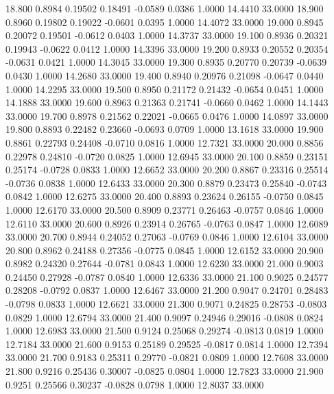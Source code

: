   18.800   0.8984   0.19502   0.18491  -0.0589   0.0386   1.0000  14.4410  33.0000
  18.900   0.8960   0.19802   0.19022  -0.0601   0.0395   1.0000  14.4072  33.0000
  19.000   0.8945   0.20072   0.19501  -0.0612   0.0403   1.0000  14.3737  33.0000
  19.100   0.8936   0.20321   0.19943  -0.0622   0.0412   1.0000  14.3396  33.0000
  19.200   0.8933   0.20552   0.20354  -0.0631   0.0421   1.0000  14.3045  33.0000
  19.300   0.8935   0.20770   0.20739  -0.0639   0.0430   1.0000  14.2680  33.0000
  19.400   0.8940   0.20976   0.21098  -0.0647   0.0440   1.0000  14.2295  33.0000
  19.500   0.8950   0.21172   0.21432  -0.0654   0.0451   1.0000  14.1888  33.0000
  19.600   0.8963   0.21363   0.21741  -0.0660   0.0462   1.0000  14.1443  33.0000
  19.700   0.8978   0.21562   0.22021  -0.0665   0.0476   1.0000  14.0897  33.0000
  19.800   0.8893   0.22482   0.23660  -0.0693   0.0709   1.0000  13.1618  33.0000
  19.900   0.8861   0.22793   0.24408  -0.0710   0.0816   1.0000  12.7321  33.0000
  20.000   0.8856   0.22978   0.24810  -0.0720   0.0825   1.0000  12.6945  33.0000
  20.100   0.8859   0.23151   0.25174  -0.0728   0.0833   1.0000  12.6652  33.0000
  20.200   0.8867   0.23316   0.25514  -0.0736   0.0838   1.0000  12.6433  33.0000
  20.300   0.8879   0.23473   0.25840  -0.0743   0.0842   1.0000  12.6275  33.0000
  20.400   0.8893   0.23624   0.26155  -0.0750   0.0845   1.0000  12.6170  33.0000
  20.500   0.8909   0.23771   0.26463  -0.0757   0.0846   1.0000  12.6110  33.0000
  20.600   0.8926   0.23914   0.26765  -0.0763   0.0847   1.0000  12.6089  33.0000
  20.700   0.8944   0.24052   0.27063  -0.0769   0.0846   1.0000  12.6104  33.0000
  20.800   0.8962   0.24188   0.27356  -0.0775   0.0845   1.0000  12.6152  33.0000
  20.900   0.8982   0.24320   0.27644  -0.0781   0.0843   1.0000  12.6230  33.0000
  21.000   0.9003   0.24450   0.27928  -0.0787   0.0840   1.0000  12.6336  33.0000
  21.100   0.9025   0.24577   0.28208  -0.0792   0.0837   1.0000  12.6467  33.0000
  21.200   0.9047   0.24701   0.28483  -0.0798   0.0833   1.0000  12.6621  33.0000
  21.300   0.9071   0.24825   0.28753  -0.0803   0.0829   1.0000  12.6794  33.0000
  21.400   0.9097   0.24946   0.29016  -0.0808   0.0824   1.0000  12.6983  33.0000
  21.500   0.9124   0.25068   0.29274  -0.0813   0.0819   1.0000  12.7184  33.0000
  21.600   0.9153   0.25189   0.29525  -0.0817   0.0814   1.0000  12.7394  33.0000
  21.700   0.9183   0.25311   0.29770  -0.0821   0.0809   1.0000  12.7608  33.0000
  21.800   0.9216   0.25436   0.30007  -0.0825   0.0804   1.0000  12.7823  33.0000
  21.900   0.9251   0.25566   0.30237  -0.0828   0.0798   1.0000  12.8037  33.0000

